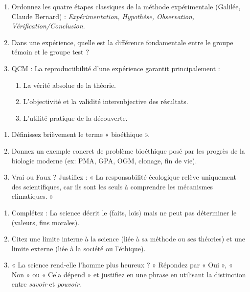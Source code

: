 \documentclass[11pt]{article}
\begin{document}
\begin{exercice}
\begin{enumerate}
    \item Ordonnez les quatre étapes classiques de la méthode expérimentale (Galilée, Claude Bernard) : \textit{Expérimentation, Hypothèse, Observation, Vérification/Conclusion}.
    \item Dans une expérience, quelle est la différence fondamentale entre le groupe témoin et le groupe test ?
    \item QCM : La reproductibilité d'une expérience garantit principalement :
    \begin{enumerate}
        \item La vérité absolue de la théorie.
        \item L'objectivité et la validité intersubjective des résultats.
        \item L'utilité pratique de la découverte.
    \end{enumerate}
\end{enumerate}
\end{exercice}

\begin{exercice}
\begin{enumerate}
    \item Définissez brièvement le terme « bioéthique ».
    \item Donnez un exemple concret de problème bioéthique posé par les progrès de la biologie moderne (ex: PMA, GPA, OGM, clonage, fin de vie).
    \item Vrai ou Faux ? Justifiez : « La responsabilité écologique relève uniquement des scientifiques, car ils sont les seuls à comprendre les mécanismes climatiques. »
\end{enumerate}
\end{exercice}

\begin{exercice}
\begin{enumerate}
    \item Complétez : La science décrit le \underline{\hspace{3cm}} (faits, lois) mais ne peut pas déterminer le \underline{\hspace{3cm}} (valeurs, fins morales).
    \item Citez une limite interne à la science (liée à sa méthode ou ses théories) et une limite externe (liée à la société ou l'éthique).
    \item « La science rend-elle l'homme plus heureux ? » Répondez par « Oui », « Non » ou « Cela dépend » et justifiez en une phrase en utilisant la distinction entre \textit{savoir} et \textit{pouvoir}.
\end{enumerate}
\end{exercice}
\end{document}
